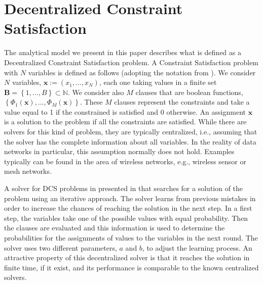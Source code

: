 \documentclass[journal]{IEEEtran}
\begin{document}
\section{Decentralized Constraint Satisfaction}
\label{sec:dcs}
The analytical model we present in this paper describes what is defined as a Decentralized Constraint Satisfaction problem. A Constraint Satisfaction problem with $N$ variables is defined as follows (adopting the notation from \cite{duffy2011dcs}).
We consider $N$ variables,  \mbox{$\mathbf{x} := (x_1,\dots,x_N)$}, each one taking values in a finite set $\mathbf{B}=\left\{1, \dots, B \right\} \subset \mathbb{N} $.
We consider also $M$ clauses that are boolean functions, $\left\{ \Phi_1(\mathbf{x}),\dots,\Phi_M(\mathbf{x}) \right\}$.
These $M$ clauses represent the constraints and take a value equal to 1 if the constrained is satisfied and 0 otherwise.
An assignment $\mathbf{x}$ is a solution to the problem if all the constraints are satisfied.
While there are solvers for this kind of problem, they are typically centralized, i.e., assuming that the solver has the complete information about all variables. 
In the reality of data networks in particular, this assumption normally does not hold. Examples typically can be found in the area of wireless networks, e.g., wireless sensor or mesh networks. 

A solver for DCS problems in presented in \cite{duffy2011dcs} that searches for a solution of the problem using an iterative approach.
The solver learns from previous mistakes in order to increase the chances of reaching the solution in the next step.
In a first step, the variables take one of the possible values with equal probability.
Then the clauses are evaluated and this information is used to determine the probabilities for the assignments of values to the variables in the next round.
The solver uses two different parameters, $a$ and $b$, to adjust the learning process.
An attractive property of this decentralized solver is that it reaches the solution in finite time, if it exist, and its performance is comparable to the known centralized solvers.

\end{document}
